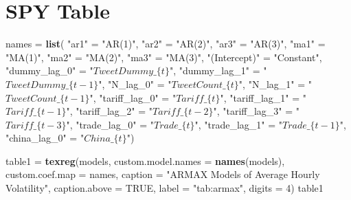 \documentclass[
]{book}
\newenvironment{Shaded}{\begin{snugshade}}{\end{snugshade}}
\newcommand{\AttributeTok}[1]{\textcolor[rgb]{0.13,0.29,0.53}{#1}}
\newcommand{\ConstantTok}[1]{\textcolor[rgb]{0.56,0.35,0.01}{#1}}
\newcommand{\DecValTok}[1]{\textcolor[rgb]{0.00,0.00,0.81}{#1}}
\newcommand{\FunctionTok}[1]{\textcolor[rgb]{0.13,0.29,0.53}{\textbf{#1}}}
\newcommand{\NormalTok}[1]{#1}
\newcommand{\OtherTok}[1]{\textcolor[rgb]{0.56,0.35,0.01}{#1}}
\newcommand{\StringTok}[1]{\textcolor[rgb]{0.31,0.60,0.02}{#1}}
\begin{document}
\section{SPY Table}\label{spy-table}

\begin{Shaded}
\begin{Highlighting}[]
\NormalTok{names }\OtherTok{=} \FunctionTok{list}\NormalTok{( }\StringTok{"ar1"} \OtherTok{=} \StringTok{"AR(1)"}\NormalTok{,}
              \StringTok{"ar2"} \OtherTok{=} \StringTok{"AR(2)"}\NormalTok{,}
              \StringTok{"ar3"} \OtherTok{=} \StringTok{"AR(3)"}\NormalTok{,}
              \StringTok{"ma1"} \OtherTok{=} \StringTok{"MA(1)"}\NormalTok{,}
              \StringTok{"ma2"} \OtherTok{=} \StringTok{"MA(2)"}\NormalTok{,}
              \StringTok{"ma3"} \OtherTok{=} \StringTok{"MA(3)"}\NormalTok{,}
              \StringTok{"(Intercept)"} \OtherTok{=} \StringTok{"Constant"}\NormalTok{,}
              \StringTok{"dummy\_lag\_0"} \OtherTok{=} \StringTok{"$TweetDummy\_\{t\}$"}\NormalTok{,}
              \StringTok{"dummy\_lag\_1"} \OtherTok{=} \StringTok{"$TweetDummy\_\{t{-}1\}$"}\NormalTok{,}
              \StringTok{"N\_lag\_0"} \OtherTok{=} \StringTok{"$TweetCount\_\{t\}$"}\NormalTok{,}
              \StringTok{"N\_lag\_1"} \OtherTok{=} \StringTok{"$TweetCount\_\{t{-}1\}$"}\NormalTok{,}
              \StringTok{"tariff\_lag\_0"} \OtherTok{=} \StringTok{"$Tariff\_\{t\}$"}\NormalTok{,}
              \StringTok{"tariff\_lag\_1"} \OtherTok{=} \StringTok{"$Tariff\_\{t{-}1\}$"}\NormalTok{,}
              \StringTok{"tariff\_lag\_2"} \OtherTok{=} \StringTok{"$Tariff\_\{t{-}2\}$"}\NormalTok{,}
              \StringTok{"tariff\_lag\_3"} \OtherTok{=} \StringTok{"$Tariff\_\{t{-}3\}$"}\NormalTok{,}
              \StringTok{"trade\_lag\_0"} \OtherTok{=} \StringTok{"$Trade\_\{t\}$"}\NormalTok{,}
              \StringTok{"trade\_lag\_1"} \OtherTok{=} \StringTok{"$Trade\_\{t{-}1\}$"}\NormalTok{,}
              \StringTok{"china\_lag\_0"} \OtherTok{=} \StringTok{"$China\_\{t\}$"}\NormalTok{)}

\NormalTok{table1 }\OtherTok{=} \FunctionTok{texreg}\NormalTok{(models,}
          \AttributeTok{custom.model.names =} \FunctionTok{names}\NormalTok{(models), }
          \AttributeTok{custom.coef.map =}\NormalTok{ names,}
          \AttributeTok{caption =} \StringTok{"ARMAX Models of Average Hourly Volatility"}\NormalTok{,}
          \AttributeTok{caption.above =} \ConstantTok{TRUE}\NormalTok{,}
          \AttributeTok{label =} \StringTok{"tab:armax"}\NormalTok{,}
          \AttributeTok{digits =} \DecValTok{4}\NormalTok{)}
\NormalTok{table1}
\end{Highlighting}
\end{Shaded}
\end{document}
